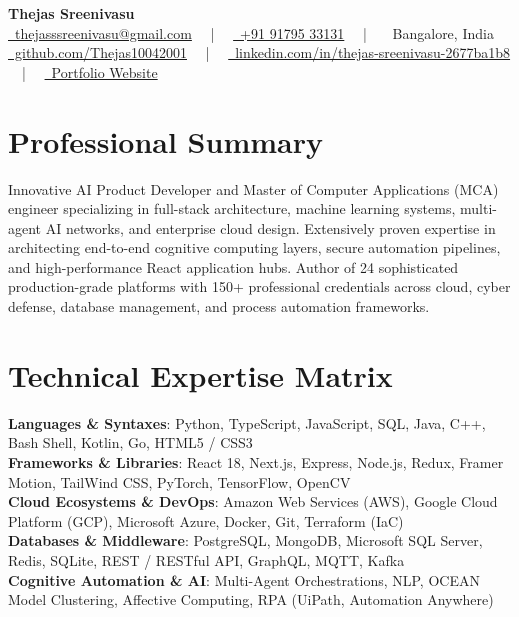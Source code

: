 \documentclass[letterpaper,10pt]{article}
\begin{document}
\begin{center}
  \textbf{\Huge\color{AccentColor}Thejas Sreenivasu} \\ \vspace{6pt}
  \small{
    \href{mailto:thejasssreenivasu@gmail.com}{\color{IconColor}\faEnvelope\ \color{black}thejasssreenivasu@gmail.com} \ \ | \ \ 
    \href{tel:+919179533131}{\color{IconColor}\faPhone\ \color{black}+91 91795 33131} \ \ | \ \ 
    {\color{IconColor}\faMapMarkerAlt\ \color{black}Bangalore, India} \\ \vspace{4pt}
    \href{https://github.com/Thejas10042001}{\color{IconColor}\faGithub\ \color{black}github.com/Thejas10042001} \ \ | \ \ 
    \href{https://www.linkedin.com/in/thejas-sreenivasu-2677ba1b8}{\color{IconColor}\faLinkedin\ \color{black}linkedin.com/in/thejas-sreenivasu-2677ba1b8} \ \ | \ \ 
    \href{https://thejassreenivasuaiportfolio.vercel.app/}{\color{IconColor}\faGlobe\ \color{black}Portfolio Website}
  }
\end{center}

\section{Professional Summary}
Innovative AI Product Developer and Master of Computer Applications (MCA) engineer specializing in full-stack architecture, machine learning systems, multi-agent AI networks, and enterprise cloud design. Extensively proven expertise in architecting end-to-end cognitive computing layers, secure automation pipelines, and high-performance React application hubs. Author of 24 sophisticated production-grade platforms with 150+ professional credentials across cloud, cyber defense, database management, and process automation frameworks.

\section{Technical Expertise Matrix}
\begin{itemize}[leftmargin=0.15in, label={}]
  \small{\item{
    \textbf{Languages \& Syntaxes}{: Python, TypeScript, JavaScript, SQL, Java, C++, Bash Shell, Kotlin, Go, HTML5 / CSS3} \\
    \textbf{Frameworks \& Libraries}{: React 18, Next.js, Express, Node.js, Redux, Framer Motion, TailWind CSS, PyTorch, TensorFlow, OpenCV} \\
    \textbf{Cloud Ecosystems \& DevOps}{: Amazon Web Services (AWS), Google Cloud Platform (GCP), Microsoft Azure, Docker, Git, Terraform (IaC)} \\
    \textbf{Databases \& Middleware}{: PostgreSQL, MongoDB, Microsoft SQL Server, Redis, SQLite, REST / RESTful API, GraphQL, MQTT, Kafka} \\
    \textbf{Cognitive Automation \& AI}{: Multi-Agent Orchestrations, NLP, OCEAN Model Clustering, Affective Computing, RPA (UiPath, Automation Anywhere)}
  }}
\end{itemize}
\end{document}
